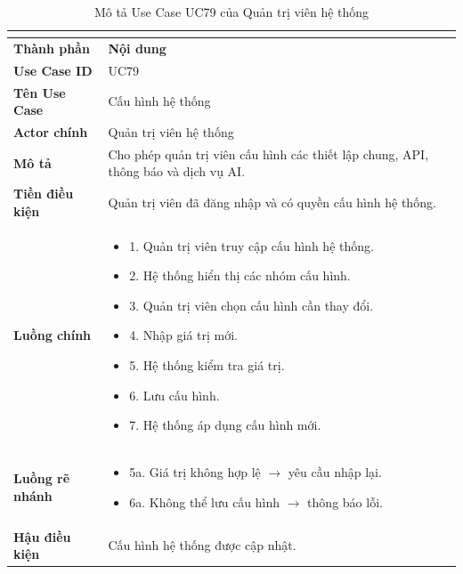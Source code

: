 \begin{longtable}{|C{3cm}|L{11cm}|}
\caption{Mô tả Use Case UC79 của Quản trị viên hệ thống}\\
\label{tab:mo-ta-uc79-quan-tri-vien}\\
\hline
\textbf{Thành phần} & \textbf{Nội dung} \\
\hline
\textbf{Use Case ID} & UC79 \\
\hline
\textbf{Tên Use Case} & Cấu hình hệ thống \\
\hline
\textbf{Actor chính} & Quản trị viên hệ thống \\
\hline
\textbf{Mô tả} &
Cho phép quản trị viên cấu hình các thiết lập chung, API, thông báo và dịch vụ AI.
\\
\hline
\textbf{Tiền điều kiện} &
Quản trị viên đã đăng nhập và có quyền cấu hình hệ thống.
\\
\hline
\textbf{Luồng chính} &
\begin{itemize}[leftmargin=*,topsep=2pt,itemsep=2pt]
    \item 1. Quản trị viên truy cập cấu hình hệ thống.
    \item 2. Hệ thống hiển thị các nhóm cấu hình.
    \item 3. Quản trị viên chọn cấu hình cần thay đổi.
    \item 4. Nhập giá trị mới.
    \item 5. Hệ thống kiểm tra giá trị.
    \item 6. Lưu cấu hình.
    \item 7. Hệ thống áp dụng cấu hình mới.
\end{itemize}
\\
\hline
\textbf{Luồng rẽ nhánh} &
\begin{itemize}[leftmargin=*,topsep=2pt,itemsep=2pt]
    \item 5a. Giá trị không hợp lệ $\rightarrow$ yêu cầu nhập lại.
    \item 6a. Không thể lưu cấu hình $\rightarrow$ thông báo lỗi.
\end{itemize}
\\
\hline
\textbf{Hậu điều kiện} &
Cấu hình hệ thống được cập nhật.
\\
\hline
\end{longtable}


